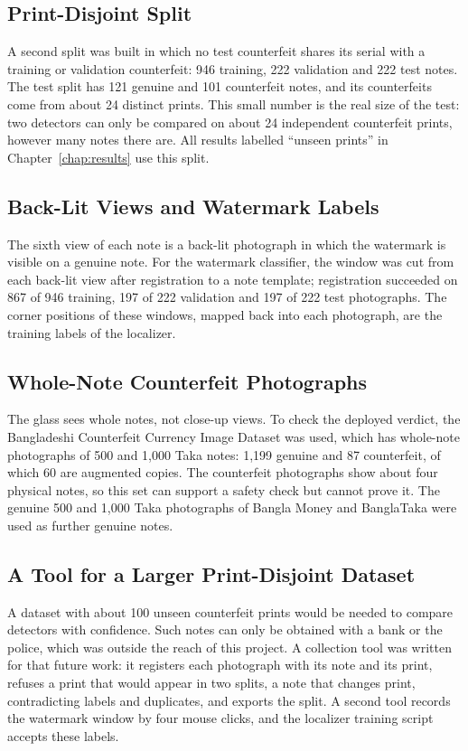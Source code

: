 \subsection{Print-Disjoint Split}
\label{sec:serial_split}
A second split was built in which no test counterfeit shares its serial with a training or validation counterfeit: 946 training, 222 validation and 222 test notes. The test split has 121 genuine and 101 counterfeit notes, and its counterfeits come from about 24 distinct prints. This small number is the real size of the test: two detectors can only be compared on about 24 independent counterfeit prints, however many notes there are. All results labelled ``unseen prints'' in Chapter~\ref{chap:results} use this split.

\subsection{Back-Lit Views and Watermark Labels}
The sixth view of each note is a back-lit photograph in which the watermark is visible on a genuine note. For the watermark classifier, the window was cut from each back-lit view after registration to a note template; registration succeeded on 867 of 946 training, 197 of 222 validation and 197 of 222 test photographs. The corner positions of these windows, mapped back into each photograph, are the training labels of the localizer.

\subsection{Whole-Note Counterfeit Photographs}
The glass sees whole notes, not close-up views. To check the deployed verdict, the Bangladeshi Counterfeit Currency Image Dataset was used, which has whole-note photographs of 500 and 1,000 Taka notes: 1,199 genuine and 87 counterfeit, of which 60 are augmented copies. The counterfeit photographs show about four physical notes, so this set can support a safety check but cannot prove it. The genuine 500 and 1,000 Taka photographs of Bangla Money and BanglaTaka were used as further genuine notes.

\subsection{A Tool for a Larger Print-Disjoint Dataset}
A dataset with about 100 unseen counterfeit prints would be needed to compare detectors with confidence. Such notes can only be obtained with a bank or the police, which was outside the reach of this project. A collection tool was written for that future work: it registers each photograph with its note and its print, refuses a print that would appear in two splits, a note that changes print, contradicting labels and duplicates, and exports the split. A second tool records the watermark window by four mouse clicks, and the localizer training script accepts these labels.

